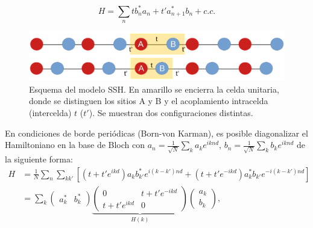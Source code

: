 \begin{equation*}
	H = \sum_n t b_n^*a_n + t'  a_{n+1}^*b_n  + c.c.
\end{equation*}



\begin{figure}[h]
\centering
	\includegraphics[width=0.8\linewidth]{media/ssh-model.png}
	\caption[Esquema del modelo SSH.]{Esquema del modelo SSH. En amarillo se encierra la celda unitaria, donde se distinguen los sitios A y B y el acoplamiento intracelda (intercelda) $t$ ($t'$). Se muestran dos configuraciones distintas. \label{fig:ssh-model}}
\end{figure}
En condiciones de borde periódicas (Born-von Karman), es posible diagonalizar el Hamiltoniano en la base de Bloch con $a_n = \frac{1}{\sqrt{N}}\sum_k a_k e^{iknd}$, $b_n = \frac{1}{\sqrt{N}}\sum_k b_k e^{iknd}$ de la siguiente forma:
\begin{align*}
	H &= \frac{1}{N}\sum_n \sum_{k k'} \left[\left(t + t' e^{ikd}\right) a_k b_{k'}^* e^{i(k-k')nd}  + \left(t  + t' e^{-ikd}\right) a_k^* b_{k'} e^{-i(k-k')nd} \right]
	\\
	&=  \sum_k 
	\begin{pmatrix}
		a_k^* & b_k^*		
	\end{pmatrix}
	\underbrace{
	\begin{pmatrix}
		0 & t+ t'e^{-ikd}
		\\
		t+ t'e^{ikd} & 0
	\end{pmatrix}}_{H(k)}
	\begin{pmatrix}
		a_k
		\\
		b_k		
	\end{pmatrix},
\end{align*}
